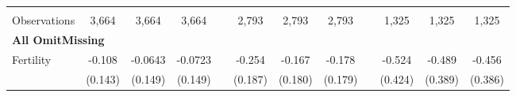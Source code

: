 \begin{landscape}
\begin{table}[htpb!]
\begin{center}
\begin{tabular}{lcccp{2mm}cccp{2mm}ccc}
\begin{footnotesize}\end{footnotesize}&\begin{footnotesize}\end{footnotesize}&\begin{footnotesize}\end{footnotesize}&\begin{footnotesize}\end{footnotesize}&\begin{footnotesize}\end{footnotesize}&\begin{footnotesize}\end{footnotesize}&\begin{footnotesize}\end{footnotesize}&\begin{footnotesize}\end{footnotesize}&\begin{footnotesize}\end{footnotesize}&\begin{footnotesize}\end{footnotesize}&\begin{footnotesize}\end{footnotesize}&\begin{footnotesize}\end{footnotesize}\\Observations&3,664&3,664&3,664&&2,793&2,793&2,793&&1,325&1,325&1,325\\
\multicolumn{12}{l}{\textbf{All OmitMissing}}\\ 
Fertility&-0.108&-0.0643&-0.0723&&-0.254&-0.167&-0.178&&-0.524&-0.489&-0.456\\
&(0.143)&(0.149)&(0.149)&&(0.187)&(0.180)&(0.179)&&(0.424)&(0.389)&(0.386)\\

\end{tabular}
\end{center}
\end{table}
\end{landscape}
